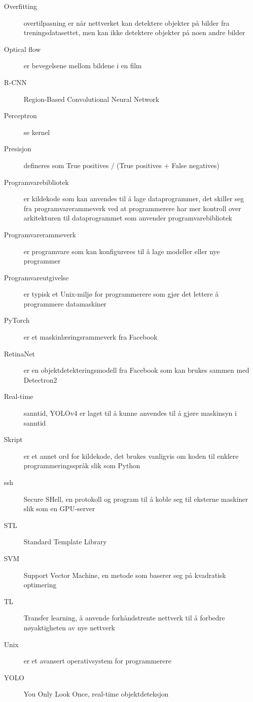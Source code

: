 \begin{description}
\item[Overfitting] overtilpasning er når nettverket kan detektere objekter på bilder fra treningsdatasettet, men kan ikke detektere objekter på noen andre bilder
\item[Optical flow] er bevegelsene mellom bildene i en film
\item[R-CNN] Region-Based Convolutional Neural Network
\item[Perceptron] se kernel
\item[Presisjon] defineres som True positives / (True positives + False negatives)
\item[Programvarebibliotek] er kildekode som kan anvendes til å lage dataprogrammer, det skiller seg fra programvarerammeverk ved at programmerere har mer kontroll over arkitekturen til dataprogrammet som anvender programvarebibliotek
\item[Programvarerammeverk] er programvare som kan konfigureres til å lage modeller eller nye programmer
\item[Programvareutgivelse] er typisk et Unix-miljø for programmerere som gjør det lettere å programmere datamaskiner
\item[PyTorch] er et maskinlæringsrammeverk fra Facebook
\item[RetinaNet] er en objektdetekteringsmodell fra Facebook som kan brukes sammen med Detectron2
\item[Real-time] sanntid, YOLOv4 er laget til å kunne anvendes til å gjøre maskinsyn i sanntid
\item[Skript] er et annet ord for kildekode, det brukes vanligvis om koden til enklere programmeringsspråk slik som Python
\item[ssh] Secure SHell, en protokoll og program til å koble seg til eksterne maskiner slik som en GPU-server
\item[STL] Standard Template Library
\item[SVM] Support Vector Machine, en metode som baserer seg på kvadratisk optimering
\item[TL] Transfer learning, å anvende forhåndstrente nettverk til å forbedre nøyaktigheten av nye nettverk
\item[Unix] er et avansert operativsystem for programmerere
\item[YOLO] You Only Look Once, real-time objektdeteksjon


\end{description}